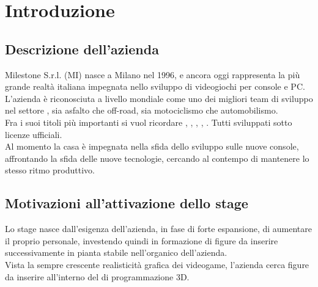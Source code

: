 
\chapter{Introduzione}
\label{cap:introduzione}

\section{Descrizione dell'azienda}

Milestone S.r.l. (MI) nasce a Milano nel 1996, e ancora oggi rappresenta la più grande realtà italiana impegnata nello sviluppo di videogiochi per console e PC. L'azienda è riconosciuta a livello mondiale come uno dei migliori team di sviluppo nel settore , sia asfalto che off-road, sia motociclismo che automobilismo\cite{site:milestone}.\\

Fra i suoi titoli più importanti si vuol ricordare , , , , . Tutti sviluppati sotto licenze ufficiali.\\

Al momento la casa è impegnata nella sfida dello sviluppo sulle nuove console, affrontando la sfida delle nuove tecnologie, cercando al contempo di mantenere lo stesso ritmo produttivo. 

\section{Motivazioni all'attivazione dello stage}

Lo stage nasce dall'esigenza dell'azienda, in fase di forte espansione, di aumentare il proprio personale, investendo quindi in formazione di figure  da inserire successivamente in pianta stabile nell'organico dell'azienda.\\

Vista la sempre crescente realisticità grafica dei videogame, l'azienda cerca figure da inserire all'interno del  di programmazione 3D.

